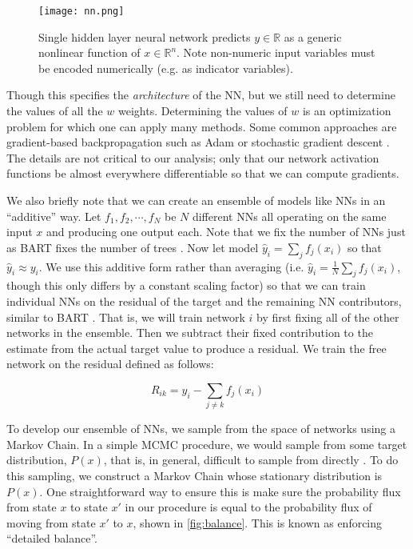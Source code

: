 \documentclass[12pt]{article}
\begin{document}
\begin{figure}[htb]
\centering
    \texttt{[image: nn.png]}
    \caption{Single hidden layer neural network predicts $y \in \mathbb{R}$ as a generic nonlinear function of $x \in \mathbb{R}^n$.  Note non-numeric input variables must be encoded numerically (e.g. as indicator variables).}
    \label{fig:nn}
\end{figure}

Though this specifies the \emph{architecture} of the NN, but we still need to determine the values of all the $w$ weights.  Determining the values of $w$ is an optimization problem for which one can apply many methods.  Some common approaches are gradient-based backpropagation such as Adam \cite{kingma2014adam} or stochastic gradient descent \cite{hastie2009elements}.  The details are not critical to our analysis; only that our network activation functions be almost everywhere differentiable so that we can compute gradients.

We also briefly note that we can create an ensemble of models like NNs in an ``additive'' way.  Let $f_1, f_2, \cdots, f_N$ be $N$ different NNs all operating on the same input $x$ and producing one output each.  Note that we fix the number of NNs just as BART fixes the number of trees \cite{chipman2010bart}.  Now let model $\hat{y}_i = \sum_j f_j(x_i)$ so that $\hat{y}_i \approx y_i$.  We use this additive form rather than averaging (i.e. $\hat{y}_i = \frac{1}{N} \sum_j f_j(x_i)$, though this only differs by a constant scaling factor) so that we can train individual NNs on the residual of the target and the remaining NN contributors, similar to BART \cite{chipman2010bart}.  That is, we will train network $i$ by first fixing all of the other networks in the ensemble.  Then we subtract their fixed contribution to the estimate from the actual target value to produce a residual.  We train the free network on the residual defined as follows:

$$
R_{ik} = y_i - \sum_{j\neq k} f_j(x_i)
$$

To develop our ensemble of NNs, we sample from the space of networks using a Markov Chain.  In a simple MCMC procedure, we would sample from some target distribution, $P(x)$, that is, in general, difficult to sample from directly \cite{haugh2021tutorial}.  To do this sampling, we construct a Markov Chain whose stationary distribution is $P(x)$.  One straightforward way to ensure this is make sure the probability flux from state $x$ to state $x'$ in our procedure is equal to the probability flux of moving from state $x'$ to $x$, shown in \autoref{fig:balance}.  This is known as enforcing ``detailed balance''.
\end{document}
